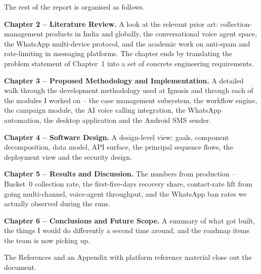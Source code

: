 The rest of the report is organised as follows.

\textbf{Chapter 2 -- Literature Review.} A look at the relevant prior art: collection-management products in India and globally, the conversational voice agent space, the WhatsApp multi-device protocol, and the academic work on anti-spam and rate-limiting in messaging platforms. The chapter ends by translating the problem statement of Chapter~1 into a set of concrete engineering requirements.

\textbf{Chapter 3 -- Proposed Methodology and Implementation.} A detailed walk through the development methodology used at Ignosis and through each of the modules I worked on -- the case management subsystem, the workflow engine, the campaign module, the AI voice calling integration, the WhatsApp automation, the desktop application and the Android SMS sender.

\textbf{Chapter 4 -- Software Design.} A design-level view: goals, component decomposition, data model, API surface, the principal sequence flows, the deployment view and the security design.

\textbf{Chapter 5 -- Results and Discussion.} The numbers from production -- Bucket~0 collection rate, the first-five-days recovery share, contact-rate lift from going multi-channel, voice-agent throughput, and the WhatsApp ban rates we actually observed during the runs.

\textbf{Chapter 6 -- Conclusions and Future Scope.} A summary of what got built, the things I would do differently a second time around, and the roadmap items the team is now picking up.

The References and an Appendix with platform reference material close out the document.
